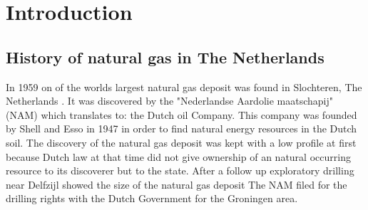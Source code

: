 
\chapter{Introduction}\label{ch:introduction}

\section{History of natural gas in The Netherlands}




















In 1959 on of the worlds largest natural gas deposit was found in Slochteren, The Netherlands \cite{nam-2014}. It was discovered by the "Nederlandse Aardolie maatschapij" (NAM)  which translates to: the Dutch oil Company. This company was founded by Shell and Esso in 1947 \cite{oprichting-nam} in order to find natural energy resources in the Dutch soil. The discovery of the natural gas deposit was kept with a low profile at first because Dutch law at that time \cite{mijnwet} did not give ownership of an natural occurring resource to its discoverer but to the state. After a follow up exploratory drilling near Delfzijl  showed the size of the natural gas deposit  The NAM filed for the drilling rights with the Dutch Government for the Groningen area. 

